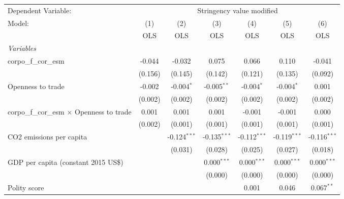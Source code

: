 
\begingroup
\centering
\begin{tabular}{lcccccc}
   \toprule
   Dependent Variable: & \multicolumn{6}{c}{Stringency value modified}\\
   Model:                                            & (1)     & (2)            & (3)            & (4)            & (5)            & (6)\\  
                                                     &  OLS    & OLS            & OLS            & OLS            & OLS            & OLS\\  
   \midrule
   \emph{Variables}\\
   corpo\_f\_cor\_esm                                & -0.044  & -0.032         & 0.075          & 0.066          & 0.110          & -0.041\\   
                                                     & (0.156) & (0.145)        & (0.142)        & (0.121)        & (0.135)        & (0.092)\\   
   Openness to trade                                 & -0.002  & -0.004$^{*}$   & -0.005$^{**}$  & -0.004$^{*}$   & -0.004$^{*}$   & 0.001\\   
                                                     & (0.002) & (0.002)        & (0.002)        & (0.002)        & (0.002)        & (0.002)\\   
   corpo\_f\_cor\_esm $\times$ Openness to trade     & 0.001   & 0.001          & 0.001          & -0.001         & -0.001         & 0.000\\   
                                                     & (0.002) & (0.001)        & (0.001)        & (0.001)        & (0.001)        & (0.001)\\   
   CO2 emissions per capita                          &         & -0.124$^{***}$ & -0.135$^{***}$ & -0.112$^{***}$ & -0.119$^{***}$ & -0.116$^{***}$\\   
                                                     &         & (0.031)        & (0.028)        & (0.025)        & (0.027)        & (0.018)\\   
   GDP per capita (constant 2015 US\$)               &         &                & 0.000$^{***}$  & 0.000$^{***}$  & 0.000$^{***}$  & 0.000$^{***}$\\   
                                                     &         &                & (0.000)        & (0.000)        & (0.000)        & (0.000)\\   
   Polity score                                      &         &                &                & 0.001          & 0.046          & 0.067$^{**}$\\   

\end{tabular}
